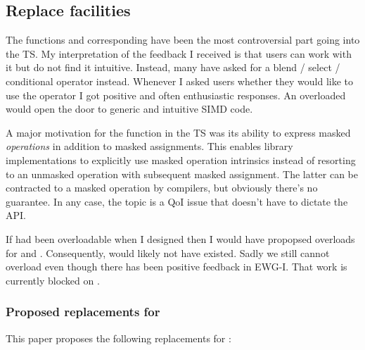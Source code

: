 \subsection{Replace  facilities}

The  functions and corresponding  have been
the most controversial part going into the TS.
My interpretation of the feedback I received is that users can work with it but
do not find it intuitive.
Instead, many have asked for a blend / select / conditional operator instead.
Whenever I asked users whether they would like to use the  operator I
got positive and often enthusiastic responses.
An overloaded  would open the door to generic and intuitive
SIMD code.

A major motivation for the  function in the TS was its ability to
express masked \emph{operations} in addition to masked assignments.
This enables library implementations to explicitly use masked operation
intrinsics instead of resorting to an unmasked operation with subsequent masked
assignment.
The latter can be contracted to a masked operation by compilers, but obviously
there's no guarantee.
In any case, the topic is a QoI issue that doesn't have to dictate the API.

If  had been overloadable when I designed \stdx\simd{} then I
would have propopsed  overloads for  and .
Consequently,  would likely not have existed.
Sadly we still cannot overload  even though there has been
positive feedback in EWG-I.
That work is currently blocked on \cite{P2600R0}.

\subsubsection{Proposed replacements for }

This paper proposes the following replacements for \stdx{}:

